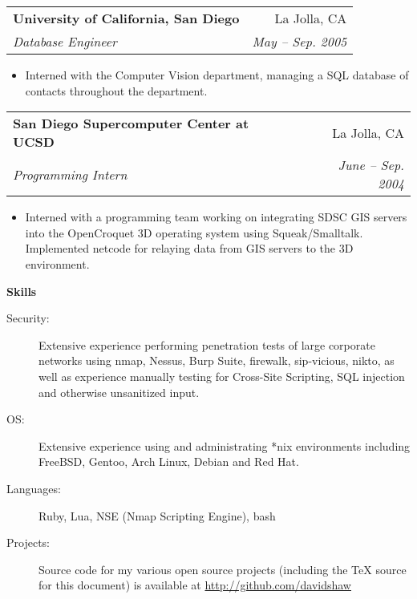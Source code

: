 \documentclass[letterpaper,11pt]{article}
\makeatletter
\newcommand{\resitem}[1]{\item #1 \vspace{-2pt}}
\newcommand{\resheading}[1]{{\large \colorbox{mygrey}{\begin{minipage}{\textwidth}{\textbf{#1 \vphantom{p\^{E}}}}\end{minipage}}}}
\newcommand{\ressubheading}[4]{
\begin{tabular*}{6.5in}{l@{\extracolsep{\fill}}r}
		\textbf{#1} & #2 \\
		\textit{#3} & \textit{#4} \\
\end{tabular*}\vspace{-6pt}}
\makeatother
\begin{document}
\begin{description}
{\begin{itemize}
				\end{itemize}
				}
	\item\ressubheading{{University of California, San Diego}}{La Jolla, CA}{Database Engineer}{May -- Sep. 2005}
				{ \footnotesize
				\begin{itemize}
					\resitem{Interned with the Computer Vision department, managing a SQL database of contacts throughout the department.}
				\end{itemize}
				}
	\item\ressubheading{{San Diego Supercomputer Center at UCSD}}{La Jolla, CA}{Programming Intern}{June -- Sep. 2004}
				{ \footnotesize
				\begin{itemize}
					\resitem{Interned with a programming team working on integrating SDSC GIS servers into the OpenCroquet 3D operating system using Squeak/Smalltalk. Implemented netcode for relaying data from GIS servers to the 3D environment.}
				\end{itemize}
				}
	\end{description}  %

\resheading{{Skills}}
	\begin{description}
		\item[Security:] { \footnotesize Extensive experience performing penetration tests of large corporate networks using nmap, Nessus, Burp Suite, firewalk, sip-vicious, nikto, as well as experience manually testing for Cross-Site Scripting, SQL injection and otherwise unsanitized input.}
		\item[OS:] { \footnotesize Extensive experience using and administrating *nix environments including FreeBSD, Gentoo, Arch Linux, Debian and Red Hat.}
		\item[Languages:] { \footnotesize Ruby, Lua, NSE (Nmap Scripting Engine), bash}
		\item[Projects:] { \footnotesize Source code for my various open source projects (including the TeX source for this document) is available at \href{http://www.github.com/davidshaw}{http://github.com/davidshaw}}
	\end{description} %
\end{document}
